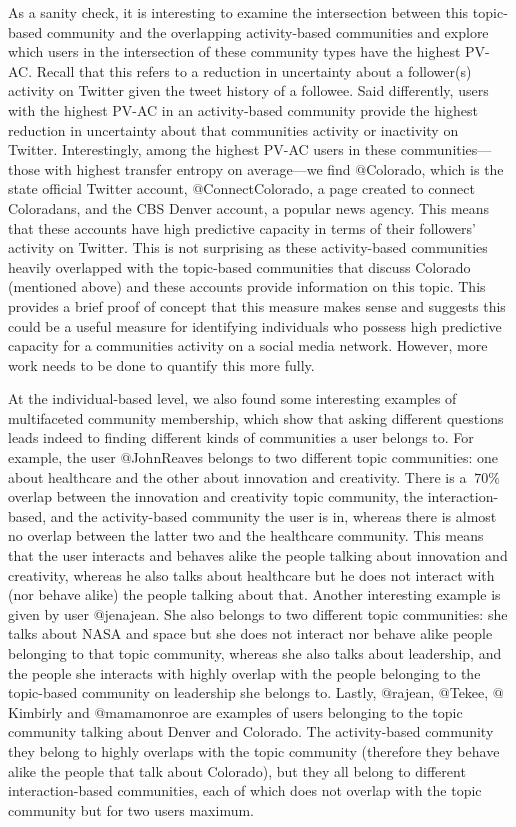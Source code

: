 As a sanity check, it is interesting to examine the intersection between this topic-based community and the overlapping activity-based communities and explore which users in the intersection of these community types have the highest PV-AC. Recall that this refers to a reduction in uncertainty about a follower(s) activity on Twitter given the tweet history of a followee. Said differently, users with the highest PV-AC in an activity-based community provide the highest reduction in uncertainty about that communities activity or inactivity on Twitter. Interestingly, among the highest PV-AC users in these communities---those with highest transfer entropy on average---we find $@$Colorado, which is the state official Twitter account, $@$ConnectColorado, a page created to connect Coloradans, and the CBS Denver account, a popular news agency. This means that these accounts have high predictive capacity in terms of their followers' activity on Twitter. This is not surprising as these activity-based communities heavily overlapped with the topic-based communities that discuss Colorado (mentioned above) and these accounts provide information on this topic. This provides a brief proof of concept that this measure makes sense and suggests this could be a useful measure for identifying individuals who possess high predictive capacity for a communities activity on a social media network. However, more work needs to be done to quantify this more fully.

At the individual-based level, we also found some interesting examples of multifaceted community membership, which show that asking different questions leads indeed to finding different kinds of communities a user belongs to.
For example, the user $@$JohnReaves belongs to two different topic communities: one about healthcare and the other about innovation and creativity. There is a $~70\%$ overlap between the innovation and creativity topic community, the interaction-based, and the activity-based community the user is in, whereas there is almost no overlap between the latter two and the healthcare community. This means that the user interacts and behaves alike the people talking about innovation and creativity, whereas he also talks about healthcare but he does not interact with (nor behave alike) the people talking about that.
Another interesting example is given by user $@$jenajean. She also belongs to two different topic communities: she talks about NASA and space but she does not interact nor behave alike people belonging to that topic community, whereas she also talks about leadership, and the people she interacts with highly overlap with the people belonging to the topic-based community on leadership she belongs to.
Lastly, $@$rajean, $@$Tekee, $@$Kimbirly and $@$mamamonroe are examples of users belonging to the topic community talking about Denver and Colorado. The activity-based community they belong to highly overlaps with the topic community (therefore they behave alike the people that talk about Colorado), but they all belong to different interaction-based communities, each of which does not overlap with the topic community but for two users maximum.
